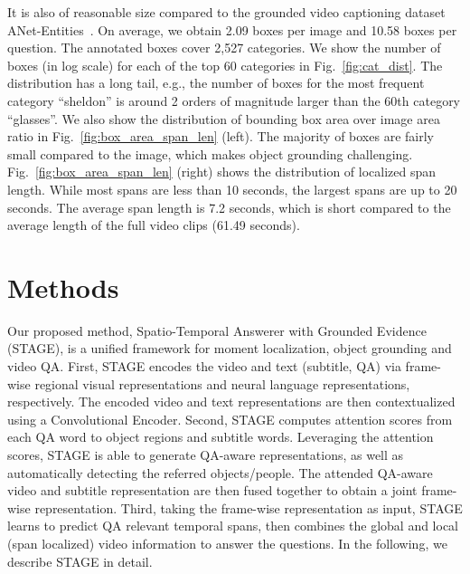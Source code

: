 \documentclass[11pt,a4paper]{article}
\begin{document}
It is also of reasonable size compared to the grounded video captioning dataset ANet-Entities~\cite{Zhou2018GroundedVD}.
On average, we obtain 2.09 boxes per image and 10.58 boxes per question. 
The annotated boxes cover 2,527 categories. 
We show the number of boxes (in log scale) for each of the top 60 categories in Fig.~\ref{fig:cat_dist}. 
The distribution has a long tail, e.g., the number of boxes for the most frequent category ``sheldon'' is around 2 orders of magnitude larger than the 60th category ``glasses''. 
We also show the distribution of bounding box area over image area ratio in Fig.~\ref{fig:box_area_span_len} (left). 
The majority of boxes are fairly small compared to the image, which makes object grounding challenging. 
Fig.~\ref{fig:box_area_span_len} (right) shows the distribution of localized span length. 
While most spans are less than 10 seconds, the largest spans are up to 20 seconds.
The average span length is 7.2 seconds, which is short compared to the average length of the full video clips (61.49 seconds).

\section{Methods}\label{sec:methods}


Our proposed method, Spatio-Temporal Answerer with Grounded Evidence (STAGE), is a unified framework for moment localization, object grounding and video QA.
First, STAGE encodes the video and text (subtitle, QA) via frame-wise regional visual representations and neural language representations, respectively. 
The encoded video and text representations are then contextualized using a Convolutional Encoder.
Second, STAGE computes attention scores from each QA word to object regions and subtitle words. 
Leveraging the attention scores, STAGE is able to generate QA-aware representations, as well as automatically detecting the referred objects/people. 
The attended QA-aware video and subtitle representation are then fused together to obtain a joint frame-wise representation.
Third, taking the frame-wise representation as input, STAGE learns to predict QA relevant temporal spans, then combines the global and local (span localized) video information to answer the questions. 
In the following, we describe STAGE in detail.

 
\end{document}
